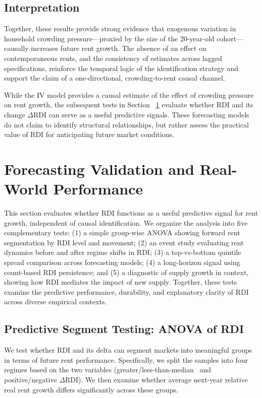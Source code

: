 \documentclass[APA,Times1COL]{WileyNJDv5} %
\begin{document}
\subsection{Interpretation}

Together, these results provide strong evidence that exogenous variation in household crowding pressure—proxied by the size of the 20-year-old cohort—causally increases future rent growth. The absence of an effect on contemporaneous rents, and the consistency of estimates across lagged specifications, reinforce the temporal logic of the identification strategy and support the claim of a one-directional, crowding-to-rent causal channel.

While the IV model provides a causal estimate of the effect of crowding pressure on rent growth, the subsequent tests in Section ~\ref{forecasting-validation} evaluate whether RDI and its change \(\Delta \text{RDI}\) can serve as a useful predictive signals. These forecasting models do not claim to identify structural relationships, but rather assess the practical value of RDI for anticipating future market conditions.

\section{Forecasting Validation and Real-World Performance}
\label{forecasting-validation}
This section evaluates whether RDI functions as a useful predictive signal for rent growth, independent of causal identification. We organize the analysis into five complementary tests: (1) a simple group-wise ANOVA showing forward rent segmentation by RDI level and movement; (2) an event study evaluating rent dynamics before and after regime shifts in RDI; (3) a top-vs-bottom quintile spread comparison across forecasting models; (4) a long-horizon signal using count-based RDI persistence; and (5) a diagnostic of supply growth in context, showing how RDI mediates the impact of new supply. Together, these tests examine the predictive performance, durability, and explanatory clarity of RDI across diverse empirical contexts.

\subsection{Predictive Segment Testing: ANOVA of RDI}
We test whether RDI and its delta can segment markets into meaningful groups in terms of future rent performance. Specifically, we split the samples into four regimes based on the two variables (greater/less-than-median \ and positive/negative \(\Delta \text{RDI}\)).  We then examine whether average next-year relative real rent growth differs significantly across these groups.
\end{document}
